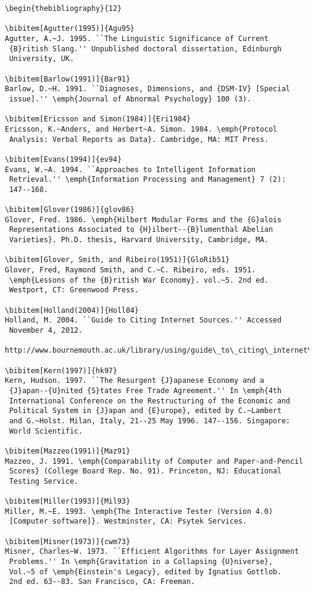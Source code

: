 \documentclass[]{tEIS2e}
\theoremstyle{plain}
\theoremstyle{remark}
\begin{document}
\begin{verbatim}
\begin{thebibliography}{12}

\bibitem[Agutter(1995)]{Agu95}
Agutter, A.~J. 1995. ``The Linguistic Significance of Current
 {B}ritish Slang.'' Unpublished doctoral dissertation, Edinburgh
 University, UK.

\bibitem[Barlow(1991)]{Bar91}
Barlow, D.~H. 1991. ``Diagnoses, Dimensions, and {DSM-IV} [Special
 issue].'' \emph{Journal of Abnormal Psychology} 100 (3).

\bibitem[Ericsson and Simon(1984)]{Eri1984}
Ericsson, K.~Anders, and Herbert~A. Simon. 1984. \emph{Protocol
 Analysis: Verbal Reports as Data}. Cambridge, MA: MIT Press.

\bibitem[Evans(1994)]{ev94}
Evans, W.~A. 1994. ``Approaches to Intelligent Information
 Retrieval.'' \emph{Information Processing and Management} 7 (2):
 147--168.

\bibitem[Glover(1986)]{glov86}
Glover, Fred. 1986. \emph{Hilbert Modular Forms and the {G}alois
 Representations Associated to {H}ilbert--{B}lumenthal Abelian
 Varieties}. Ph.D. thesis, Harvard University, Cambridge, MA.

\bibitem[Glover, Smith, and Ribeiro(1951)]{GloRib51}
Glover, Fred, Raymond Smith, and C.~C. Ribeiro, eds. 1951.
 \emph{Lessons of the {B}ritish War Economy}. vol.~5. 2nd ed.
 Westport, CT: Greenwood Press.

\bibitem[Holland(2004)]{Holl04}
Holland, M. 2004. ``Guide to Citing Internet Sources.'' Accessed
 November 4, 2012.
 http://www.bournemouth.ac.uk/library/using/guide\_to\_citing\_internet\_sourc.html.

\bibitem[Kern(1997)]{hk97}
Kern, Hudson. 1997. ``The Resurgent {J}apanese Economy and a
 {J}apan--{U}nited {S}tates Free Trade Agreement.'' In \emph{4th
 International Conference on the Restructuring of the Economic and
 Political System in {J}apan and {E}urope}, edited by C.~Lambert
 and G.~Holst. Milan, Italy, 21--25 May 1996. 147--156. Singapore:
 World Scientific.

\bibitem[Mazzeo(1991)]{Maz91}
Mazzeo, J. 1991. \emph{Comparability of Computer and Paper-and-Pencil
 Scores} (College Board Rep. No. 91). Princeton, NJ: Educational
 Testing Service.

\bibitem[Miller(1993)]{Mil93}
Miller, M.~E. 1993. \emph{The Interactive Tester (Version 4.0)
 [Computer software]}. Westminster, CA: Psytek Services.

\bibitem[Misner(1973)]{cwm73}
Misner, Charles~W. 1973. ``Efficient Algorithms for Layer Assignment
 Problems.'' In \emph{Gravitation in a Collapsing {U}niverse},
 Vol.~5 of \emph{Einstein's Legacy}, edited by Ignatius Gottlob.
 2nd ed. 63--83. San Francisco, CA: Freeman.


\end{verbatim}
\end{document}
